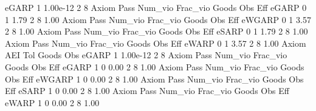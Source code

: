        eGARP {\VBAR}         1   1.00e-12          2          8 
{\smallskip}
{\smallskip}
{\smallskip}
       Axiom {\VBAR} Pass     Num_vio    Frac_vio       Goods         Obs         Eff  
       eGARP {\VBAR}    0           1        1.79           2           8        1.00  
{\smallskip}
{\smallskip}
{\smallskip}
       Axiom {\VBAR} Pass     Num_vio    Frac_vio       Goods         Obs         Eff  
      eWGARP {\VBAR}    0           1        3.57           2           8        1.00  
{\smallskip}
{\smallskip}
{\smallskip}
       Axiom {\VBAR} Pass     Num_vio    Frac_vio       Goods         Obs         Eff  
       eSARP {\VBAR}    0           1        1.79           2           8        1.00  
{\smallskip}
{\smallskip}
{\smallskip}
       Axiom {\VBAR} Pass     Num_vio    Frac_vio       Goods         Obs         Eff  
       eWARP {\VBAR}    0           1        3.57           2           8        1.00  
{\smallskip}
       Axiom {\VBAR}       AEI        Tol      Goods        Obs 
       eGARP {\VBAR}         1   1.00e-12          2          8 
{\smallskip}
{\smallskip}
{\smallskip}
       Axiom {\VBAR} Pass     Num_vio    Frac_vio       Goods         Obs         Eff  
       eGARP {\VBAR}    1           0        0.00           2           8        1.00  
{\smallskip}
{\smallskip}
{\smallskip}
       Axiom {\VBAR} Pass     Num_vio    Frac_vio       Goods         Obs         Eff  
      eWGARP {\VBAR}    1           0        0.00           2           8        1.00  
{\smallskip}
{\smallskip}
{\smallskip}
       Axiom {\VBAR} Pass     Num_vio    Frac_vio       Goods         Obs         Eff  
       eSARP {\VBAR}    1           0        0.00           2           8        1.00  
{\smallskip}
{\smallskip}
{\smallskip}
       Axiom {\VBAR} Pass     Num_vio    Frac_vio       Goods         Obs         Eff  
       eWARP {\VBAR}    1           0        0.00           2           8        1.00  
